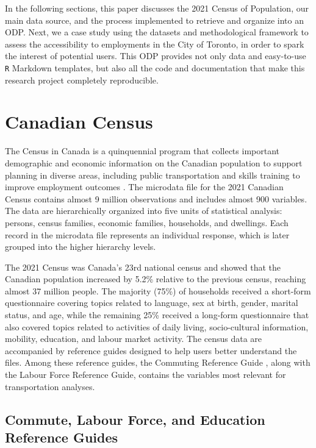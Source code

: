 \documentclass[sn-basic,lineno,pdflatex]{sn-jnl}
\begin{document}
In the following sections, this paper discusses the 2021 Census of
Population, our main data source, and the process implemented to
retrieve and organize into an ODP. Next, we a case study using the
datasets and methodological framework to assess the accessibility to
employments in the City of Toronto, in order to spark the interest of
potential users. This ODP provides not only data and easy-to-use
\texttt{R} Markdown templates, but also all the code and documentation
that make this research project completely reproducible.

\section{Canadian Census}\label{canadian-census}

The Census in Canada is a quinquennial program that collects important
demographic and economic information on the Canadian population to
support planning in diverse areas, including public transportation and
skills training to improve employment outcomes
\citep{statisticscanada2023}. The microdata file for the 2021 Canadian
Census contains almost 9 million observations and includes almost 900
variables. The data are hierarchically organized into five units of
statistical analysis: persons, census families, economic families,
households, and dwellings. Each record in the microdata file represents
an individual response, which is later grouped into the higher hierarchy
levels.

The 2021 Census was Canada's 23rd national census and showed that the
Canadian population increased by 5.2\% relative to the previous census,
reaching almost 37 million people. The majority (75\%) of households
received a short-form questionnaire covering topics related to language,
sex at birth, gender, marital status, and age, while the remaining 25\%
received a long-form questionnaire that also covered topics related to
activities of daily living, socio-cultural information, mobility,
education, and labour market activity. The census data are accompanied
by reference guides designed to help users better understand the files.
Among these reference guides, the Commuting Reference Guide
\citep{DictCensus2021}, along with the Labour Force Reference Guide,
contains the variables most relevant for transportation analyses.

\subsection{Commute, Labour Force, and Education Reference
Guides}\label{commute-labour-force-and-education-reference-guides}
\end{document}
